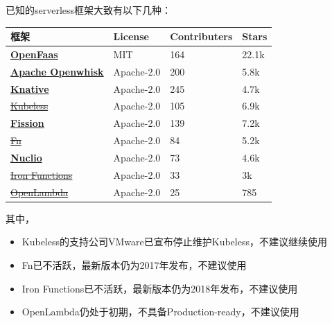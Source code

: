 已知的serverless框架大致有以下几种\cite{faas_evaluation}：

\begin{table}[ht]
\begin{tabularx}{\textwidth}{|X|p{3cm}|p{2.5cm}|p{2cm}|}
\toprule
\textbf{框架} & \textbf{License} & \textbf{Contributers} & \textbf{Stars}\\
\midrule
\href{https://github.com/openfaas/faas}{\textbf{OpenFaas}} & MIT & 164 & 22.1k \\
\hline
\href{https://github.com/apache/openwhisk}{\textbf{Apache Openwhisk}} &  Apache-2.0 & 200 & 5.8k \\
\hline
\href{https://github.com/knative/serving}{\textbf{Knative}} &  Apache-2.0 & 245 & 4.7k \\
\hline
\href{https://github.com/vmware-archive/kubeless}{\st{Kubeless}} &  Apache-2.0 & 105 & 6.9k \\
\hline
\href{https://github.com/fission/fission}{\textbf{Fission}} &  Apache-2.0 & 139 & 7.2k \\
\hline
\href{https://github.com/fnproject/fn}{\st{Fn}} &  Apache-2.0 & 84 & 5.2k \\
\hline
\href{https://github.com/nuclio/nuclio}{\textbf{Nuclio}} &  Apache-2.0 & 73 & 4.6k \\
\hline
\href{https://github.com/iron-io/functions}{\st{Iron Functions}} &  Apache-2.0 & 33 & 3k \\
\hline
\href{https://github.com/open-lambda/open-lambda}{\st{OpenLambda}} &  Apache-2.0 & 25 & 785 \\
\bottomrule
\end{tabularx}
\end{table}

其中，
\begin{itemize}
    \item Kubeless的支持公司VMware已宣布停止维护Kubeless，不建议继续使用
    \item Fn已不活跃，最新版本仍为2017年发布，不建议使用
    \item Iron Functions已不活跃，最新版本仍为2018年发布，不建议使用
    \item OpenLambda仍处于初期，不具备Production-ready，不建议使用
\end{itemize}

